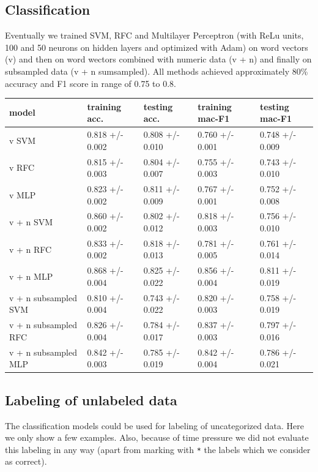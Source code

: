 \documentclass[a4paper, 12pt]{article}
\begin{document}
\subsection{Classification}
Eventually we trained SVM, RFC and Multilayer Perceptron (with ReLu units,
100 and 50 neurons on hidden layers and optimized with Adam) on word vectors (v)
and then on word wectors combined with numeric data (v + n) and finally
on subsampled data (v + n sumsampled). All methods achieved approximately 80\% accuracy and F1 score
in range of 0.75 to 0.8.

\begin{table}[h!]
\centering
\begin{tabular}{ l l l l l }
model & training acc. & testing acc. & training mac-F1 & testing mac-F1 \\  \hline \hline 
v SVM & 0.818 +/- 0.002 & 0.808 +/- 0.010 & 0.760 +/- 0.001 & 0.748 +/- 0.009 \\  
v RFC & 0.815 +/- 0.003 & 0.804 +/- 0.007 & 0.755 +/- 0.003 & 0.743 +/- 0.010 \\ 
v MLP & 0.823 +/- 0.002 & 0.811 +/- 0.009 & 0.767 +/- 0.001 & 0.752 +/- 0.008  \\ \hline 
v + n SVM & 0.860 +/- 0.002 & 0.802 +/- 0.012 & 0.818 +/- 0.003 & 0.756 +/- 0.010 \\                 
v + n RFC & 0.833 +/- 0.002 & 0.818 +/- 0.013 & 0.781 +/- 0.005 & 0.761 +/- 0.014 \\                 
v + n MLP & 0.868 +/- 0.004 & 0.825 +/- 0.022 & 0.856 +/- 0.004 & 0.811 +/- 0.019 \\ \hline 
v + n subsampled SVM & 0.810 +/- 0.004 & 0.743 +/- 0.022 & 0.820 +/- 0.003 & 0.758 +/- 0.019 \\                 
v + n subsampled RFC & 0.826 +/- 0.004 & 0.784 +/- 0.017 & 0.837 +/- 0.003 & 0.797 +/- 0.016 \\
v + n subsampled MLP & 0.842 +/- 0.003 & 0.785 +/- 0.019 & 0.842 +/- 0.004 & 0.786 +/- 0.021
\end{tabular}
\end{table}

\subsection{Labeling of unlabeled data}
The classification models could be used for labeling of uncategorized data.
Here we only show a few examples. Also, because of time pressure we did not
evaluate this labeling in any way (apart from marking with \texttt{*} the labels which we 
consider as correct).
\end{document}
